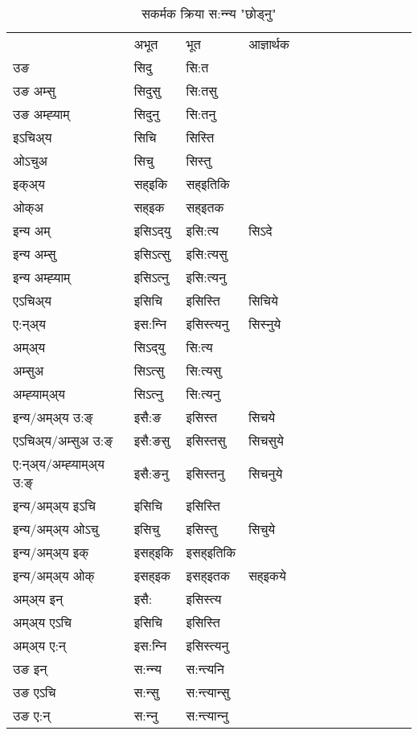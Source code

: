 \begin{table}[H]
\centering
\caption{\label{it.vt} सकर्मक क्रिया  स:न्‍न्य  "छोड्नु"  }
\begin{tabular}{l|l|l|l|l|l|l|l|l|l|l|l|l}  \toprule
&अभूत & भूत & आज्ञार्थक \\ 
उङ &सिदु &सि:त \\ 
उङ अम्सु &सिदुसु &सि:तसु \\ 
उङ अम्ह्‍याम् &सिदुनु &सि:तनु \\ 
इऽचिअ्य &सिचि &सिस्ति   \\ 
ओऽचुअ &सिचु &सिस्तु   \\ 
इक्अ्य &सह्इकि &सह्इतिकि   \\ 
ओक्अ &सह्इक &सह्इतक   \\ 
इन्य अम् & इसिऽद्‌यु  & इसि:त्य &सिऽदे  \\ 
इन्य अम्सु & इसिऽत्सु  & इसि:त्यसु   \\ 
इन्य अम्ह्‍याम् & इसिऽत्‍नु  & इसि:त्यनु   \\ 
एऽचिअ्य & इसिचि & इसिस्ति &सिचिये    \\ 
ए:न्अ्य & इस:न्‍नि  & इसिस्त्यनु &सिस्‍नुये  \\ 
अम्अ्य & सिऽद्‌यु  & सि:त्य  \\ 
अम्सुअ & सिऽत्सु & सि:त्यसु  \\ 
अम्ह्‍याम्अ्य & सिऽत्‍नु  & सि:त्यनु \\ 
\midrule
इन्य/अम्अ्य उ:ङ्‌&इसै:ङ & इसिस्त &सिचये \\ 
एऽचिअ्य/अम्सुअ उ:ङ्‌ &इसै:ङसु & इसिस्तसु &सिचसुये \\ 
ए:न्अ्य/अम्ह्‍याम्अ्य उ:ङ्‌ &इसै:ङनु & इसिस्तनु &सिचनुये \\ 
इन्य/अम्अ्य इऽचि & इसिचि & इसिस्ति    \\ 
इन्य/अम्अ्य ओऽचु & इसिचु & इसिस्तु  &सिचुये  \\ 
इन्य/अम्अ्य इक् & इसह्इकि & इसह्इतिकि   \\ 
इन्य/अम्अ्य ओक् & इसह्इक & इसह्इतक  &सह्इकये  \\ 
अम्अ्य इन् & इसै: & इसिस्त्य   \\ 
अम्अ्य एऽचि & इसिचि & इसिस्ति    \\ 
अम्अ्य ए:न् & इस:न्‍नि  & इसिस्त्यनु  \\ 
\midrule
उङ इन् & स:न्‍न्य  & स:न्त्यनि  \\ 
उङ एऽचि & स:न्सु  & स:न्त्यान्सु   \\ 
उङ ए:न्& स:न्‍नु  & स:न्त्यान्‍नु   \\ 
\bottomrule
\end{tabular}
\end{table}


